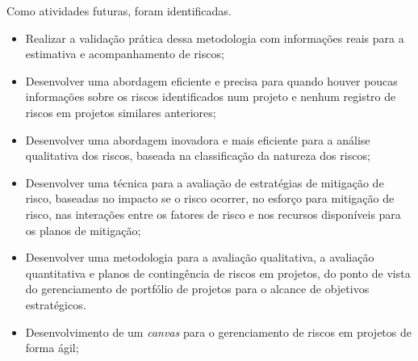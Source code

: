 Como atividades futuras, foram identificadas.
\begin{itemize}
\item Realizar a validação prática dessa metodologia com informações reais para a estimativa e acompanhamento de riscos;
\item Desenvolver uma abordagem eficiente e precisa para quando houver poucas informações sobre os riscos identificados num projeto e nenhum registro de riscos em projetos similares anteriores;
\item Desenvolver uma abordagem inovadora e mais eficiente para a análise qualitativa dos riscos, baseada na classificação da natureza dos riscos;
\item Desenvolver uma técnica para a avaliação de estratégias de mitigação de risco, baseadas no impacto se o risco ocorrer, no esforço para mitigação de risco, nas interações entre os fatores de risco e nos recursos disponíveis para os planos de mitigação;
\item Desenvolver uma metodologia para a avaliação qualitativa, a avaliação quantitativa e planos de contingência de riscos em projetos, do ponto de vista do gerenciamento de portfólio de projetos para o alcance de objetivos estratégicos.
\item Desenvolvimento de um \textit{canvas} para o gerenciamento de riscos em projetos de forma ágil;
\end{itemize}
 
\pagebreak

